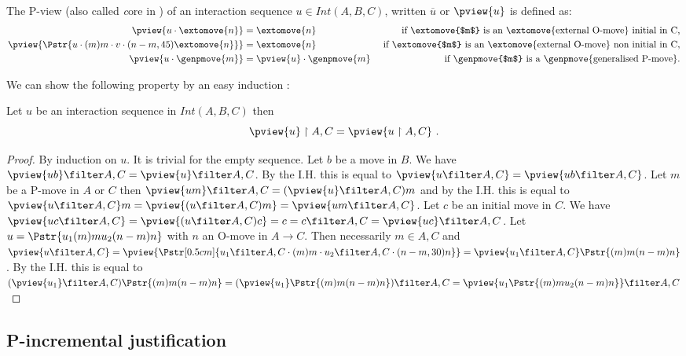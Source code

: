 The P-view (also called {\emph core} in
\cite{McCusker-GamesandFullAbstrac}) of an interaction sequence $u
\in Int(A,B,C)$, written $\overline{u}$ or $\pview{u}$ is defined
as:
\begin{align*}
\pview{u\cdot \extomove{n}} &= \extomove{n} &
\mbox{ if \extomove{$m$} is an \extomove{external O-move} initial in C,}\\
\pview{\Pstr{u\cdot (m)m\cdot v \cdot (n-m,45){\extomove{n}} }} &= \extomove{n} &\mbox{ if \extomove{$m$} is an \extomove{external O-move} non initial in C,}\\
\pview{u \cdot \genpmove{m}} &= \pview{u}\cdot \genpmove{m}  & \mbox{ if \genpmove{$m$} is a \genpmove{generalised P-move}.}\\
\end{align*}

We can show the following property by an easy induction :
\begin{lemma}
\label{lem:pviewAC_eq_ACpview}
 Let $u$ be an interaction sequence in $Int(A,B,C)$ then
$$\pview{u} \upharpoonright A,C = \pview{u \upharpoonright A,C} \ .$$
\end{lemma}
\begin{proof}
  By induction on $u$. It is trivial for the empty sequence.
Let $b$ be a move in $B$. We have $\pview{u b} \filter A,C =
\pview{u} \filter A,C$. By the I.H. this is equal to $\pview{u
\filter A,C} = \pview{u b\filter A,C}$. Let $m$ be a P-move in $A$
or $C$ then $\pview{u m} \filter A,C = (\pview{u} \filter A,C) m$
and by the I.H. this is equal to $\pview{u \filter A,C} m =
\pview{(u \filter A,C) m} = \pview{u m \filter A,C}$. Let $c$ be an
initial move in $C$. We have $\pview{u c \filter A,C}  = \pview{(u
\filter A,C) c} = c =  c \filter A,C = \pview{u c} \filter A,C$. Let
$u = \Pstr{u_1 (m){m} u_2 (n-m){n}}$ with $n$ an O-move in
$A\rightarrow C$. Then necessarily $m\in A,C$ and $ \pview{u\filter
A,C} = \pview{\Pstr[0.5cm]{u_1\filter A,C \cdot (m){m} \cdot
u_2\filter A,C \cdot (n-m,30){n}}} =
 \pview{u_1 \filter A,C} \Pstr{(m){m} (n-m){n}}$. By the I.H. this is equal to
$(\pview{u_1}\filter A,C) \Pstr{(m){m} (n-m){n}} = (\pview{u_1}
\Pstr{(m){m} (n-m){n}} ) \filter A,C  = \pview{u_1 \Pstr{(m){m} u_2
(n-m){n}}} \filter A,C$
\end{proof}


\subsection{P-incremental justification}


